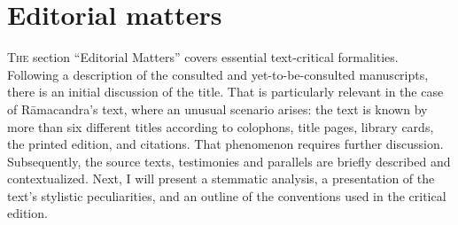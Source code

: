 \section{Editorial matters}

\lettrine[lines=2, lhang=0.2, loversize=0.25]{T}{he} section ``Editorial Matters'' covers essential text-critical formalities. Following a description of the consulted and yet-to-be-consulted manuscripts, there is an initial discussion of the title. That is particularly relevant in the case of Rāmacandra's text, where an unusual scenario arises: the text is known by more than six different titles according to colophons, title pages, library cards, the printed edition, and citations. That phenomenon requires further discussion. Subsequently, the source texts, testimonies and parallels are briefly described and contextualized. Next, I will present a stemmatic analysis, a presentation of the text's stylistic peculiarities, and an outline of the conventions used in the critical edition.

